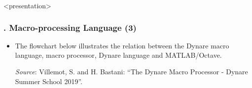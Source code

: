 \documentclass[11pt,aspectratio=169]{beamer}
\begin{document}
\begin{frame}<presentation>
	\frametitle{{\thesection.\thesubsection\thinspace\thesubsubsection} Macro-processing Language (3)}
	\begin{itemize}
		\item The flowchart below illustrates the relation between the Dynare macro language, macro processor, Dynare language and MATLAB/Octave.
		\begin{figure}
			\centering
		\end{figure}
	\hspace{1.75cm} \tiny{\textit{Source}: Villemot, S. and H. Bastani: ``The Dynare Macro Processor - Dynare Summer School 2019''.}
	\end{itemize}
\end{frame}
\end{document}
